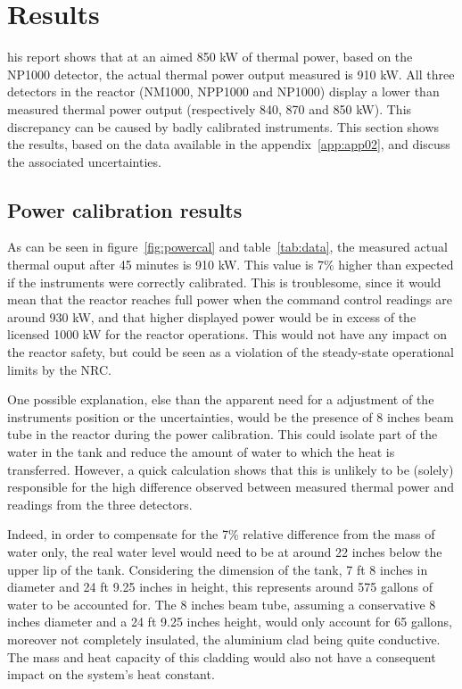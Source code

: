 %
%
\let\textcircled=\pgftextcircled
\chapter{Results}
\label{chap:result}

his report shows that at an aimed 850 kW of thermal power, based on the NP1000 detector, the actual thermal power output measured is 910 kW. All three detectors in the reactor (NM1000, NPP1000 and NP1000) display a lower than measured thermal power output (respectively 840, 870 and 850 kW). This discrepancy can be caused by badly calibrated instruments. This section shows the results, based on the data available in the appendix~\ref{app:app02}, and discuss the associated uncertainties.

\section{Power calibration results}
\label{sec:powercalibres}

As can be seen in figure~\ref{fig:powercal} and table~\ref{tab:data}, the measured actual thermal ouput after 45 minutes is 910 kW. This value is 7\% higher than expected if the instruments were correctly calibrated. This is troublesome, since it would mean that the reactor reaches full power when the command control readings are around 930 kW, and that higher displayed power would be in excess of the licensed 1000 kW for the reactor operations. This would not have any impact on the reactor safety, but could be seen as a violation of the steady-state operational limits by the NRC.

One possible explanation, else than the apparent need for a adjustment of the instruments position or the uncertainties, would be the presence of 8 inches beam tube in the reactor during the power calibration. This could isolate part of the water in the tank and reduce the amount of water to which the heat is transferred. However, a quick calculation shows that this is unlikely to be (solely) responsible for the high difference observed between measured thermal power and readings from the three detectors.

Indeed, in order to compensate for the 7\% relative difference from the mass of water only, the real water level would need to be at around 22 inches below the upper lip of the tank. Considering the dimension of the tank, 7 ft 8 inches in diameter and 24 ft 9.25 inches in height, this represents around 575 gallons of water to be accounted for. The 8 inches beam tube, assuming a conservative 8 inches diameter and a 24 ft 9.25 inches height, would only account for 65 gallons, moreover not completely insulated, the aluminium clad being quite conductive. The mass and heat capacity of this cladding would also not have a consequent impact on the system's heat constant.

